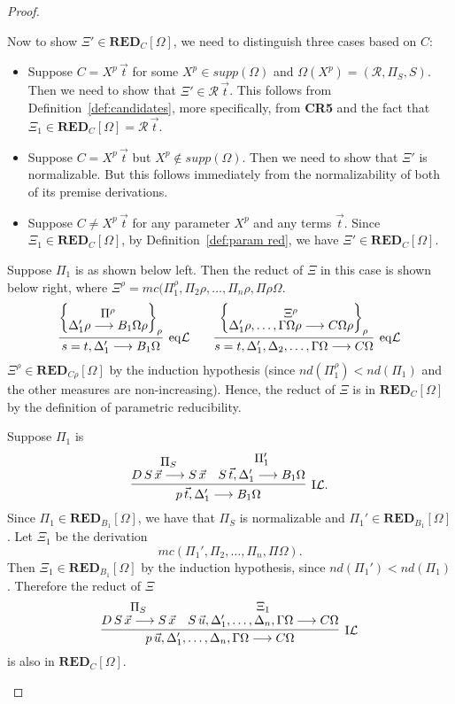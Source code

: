 \documentclass[preprint]{elsarticle}
\def\Rscr{{\mathcal R}}
\newcommand{\Seq}[2]{#1\longrightarrow #2}
\newcommand{\circL}{\circ{\cal L}}
\newcommand{\eqL}{{\rm eq}{\cal L}}
\newcommand{\indL}{{\rm I}{\cal L}}
\def\RED{{\mathbf{RED}}}
\begin{document}
\begin{proof}
\begin{trivlist}
Now to show $\Xi' \in \RED_C[\Omega]$, we need to distinguish three
cases based on $C$:
\begin{itemize}
\item Suppose $C = X^p\,\vec t$ for some $X^p \in supp(\Omega)$ and
  $\Omega(X^p) = (\Rscr, \Pi_S,S)$. Then we need to show that $\Xi'
  \in \Rscr\,\vec t$. This follows from
  Definition~\ref{def:candidates}, more specifically, from {\bf CR5}
  and the fact that $\Xi_1 \in \RED_C[\Omega] = \Rscr\,\vec t$.

\item Suppose $C = X^p \,\vec t$ but $X^p \not \in supp(\Omega)$.
  Then we need to show that $\Xi'$ is normalizable. But this follows
  immediately from the normalizability of both of its premise
  derivations.

\item Suppose $C \not = X^p\,\vec t$ for any parameter $X^p$ and any
  terms $\vec t$. Since $\Xi_1 \in \RED_C[\Omega]$, by
  Definition~\ref{def:param red}, we have $\Xi' \in \RED_C[\Omega]$.
\end{itemize}


\item[\fbox{$\eqL/\circL$}] Suppose $\Pi_1$ is as shown below left.
Then the reduct of $\Xi$ in this case is shown below right, where
$\Xi^\rho = mc(\Pi_1^\rho,\Pi_2\rho,\ldots,\Pi_n\rho,\Pi\rho\Omega$.
$$
\infer[\eqL]{\Seq{s=t,\Delta_1'}{B_1\Omega}} {\left\{\raisebox{-1.5ex}
    {\deduce{\Seq{\Delta_1'\rho}{B_1\Omega\rho}} {\Pi^{\rho}}}
  \right\}_{\rho}}
\qquad
\infer[\eqL]
{\Seq{s=t,\Delta_1',\Delta_2,\dots,\Gamma\Omega}{C\Omega}}
{\left\{\raisebox{-1.5ex}
    {\deduce{\Seq{\Delta_1'\rho,\dots,\Gamma\Omega\rho}{C\Omega\rho}}
      {\Xi^{\rho}}} \right\}_{\rho}}
$$
$\Xi^\rho \in \RED_{C\rho}[\Omega]$ by the induction hypothesis
(since $nd(\Pi_1^\rho) < nd(\Pi_1)$ and the other measures are
non-increasing). Hence, the reduct of $\Xi$ is in  $\RED_C[\Omega]$
by the definition of parametric reducibility.




\item[\fbox{$\indL/\circL$}] Suppose $\Pi_1$ is
$$
\infer[\indL.]  {\Seq{p\,\vec{t}, \Delta_1'}{B_1\Omega}} {
  \deduce{\Seq{D\,S\,\vec{x}}{S\,\vec{x}}}{\Pi_S} &
  \deduce{\Seq{S\,\vec{t}, \Delta_1'}{B_1\Omega}}{\Pi_1'} }
$$
Since $\Pi_1 \in \RED_{B_1}[\Omega]$, we have that $\Pi_S$ is
normalizable and $\Pi_1' \in \RED_{B_1}[\Omega]$.  Let $\Xi_1$ be the
derivation
$$
mc(\Pi_1',\Pi_2,\ldots,\Pi_n,\Pi\Omega).
$$
Then $\Xi_1 \in \RED_{B_1}[\Omega]$ by the induction hypothesis, since
$nd(\Pi_1') < nd(\Pi_1)$.
Therefore the reduct of $\Xi$
$$
\infer[\indL] {\Seq{p\,\vec{u},\Delta_1',
    \dots,\Delta_n,\Gamma\Omega}{C\Omega}} {
  \deduce{\Seq{D\,S\,\vec{x}}{S\,\vec{x}}}{\Pi_S} &
  \deduce{\Seq{S\,\vec{u},\Delta_1',
      \ldots,\Delta_n,\Gamma\Omega}{C\Omega}}{\Xi_1} }
$$
is also in $\RED_{C}[\Omega]$.
 

\end{trivlist}
\end{proof}
\end{document}
